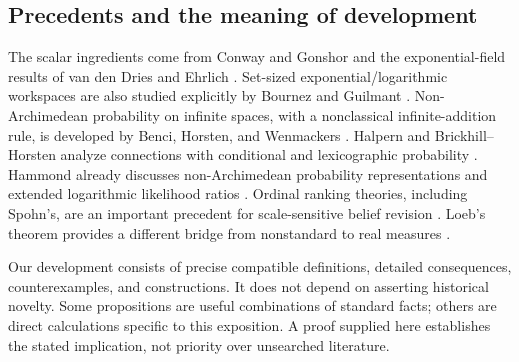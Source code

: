 \documentclass[11pt,a4paper]{article}
\numberwithin{equation}{section}
\theoremstyle{definition}
\theoremstyle{remark}
\begin{document}
\subsection{Precedents and the meaning of development}

The scalar ingredients come from Conway and Gonshor and the exponential-field
results of van den Dries and Ehrlich \cite{conway,gonshor,vdde,vddeerr}.
Set-sized exponential/logarithmic workspaces are also studied explicitly by
Bournez and Guilmant \cite{bournez}. Non-Archimedean probability on infinite
spaces, with a nonclassical infinite-addition rule, is developed by Benci,
Horsten, and Wenmackers \cite{bhw}. Halpern and Brickhill--Horsten analyze
connections with conditional and lexicographic probability
\cite{halpern,brickhill}. Hammond already discusses non-Archimedean
probability representations and extended logarithmic likelihood ratios
\cite{hammond}. Ordinal ranking theories, including Spohn's, are an important
precedent for scale-sensitive belief revision \cite{spohn}. Loeb's theorem
provides a different bridge from nonstandard to real measures \cite{loeb}.

Our development consists of precise compatible definitions, detailed
consequences, counterexamples, and constructions. It does not depend on
asserting historical novelty. Some propositions are useful combinations of
standard facts; others are direct calculations specific to this exposition.
A proof supplied here establishes the stated implication, not priority over
unsearched literature.
\end{document}
